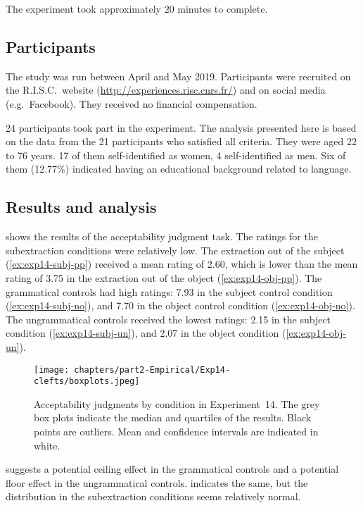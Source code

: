 The experiment took approximately 20 minutes to complete. 

\subsection{Participants}

The study was run between April and May 2019. 
Participants were recruited on the R.I.S.C.\ website (\url{http://experiences.risc.cnrs.fr/}) and on social media (e.g.\ Facebook).
They received no financial compensation.

24 participants took part in the experiment. 
The analysis presented here is based on the data from the 21 participants who satisfied all criteria.
They were aged 22 to 76 years. 17 of them self-identified as women, 4 self-identified as men. Six of them (12.77\%) indicated having an educational background related to language.

\subsection{Results and analysis}

 shows the results of the acceptability judgment task. The ratings for the subextraction conditions were relatively low. The extraction out of the subject (\ref{ex:exp14-subj-pp}) received a mean  rating of 2.60, which is lower than the mean rating of 3.75 in the extraction out of the object (\ref{ex:exp14-obj-pp}). The grammatical controls had high  ratings: 7.93 in the subject control condition (\ref{ex:exp14-subj-no}), and 7.70 in the object control condition (\ref{ex:exp14-obj-no}). The ungrammatical controls received the lowest ratings: 2.15 in the subject condition (\ref{ex:exp14-subj-un}), and 2.07 in the object condition (\ref{ex:exp14-obj-un}). 

\begin{figure}
    \centering
    \texttt{[image: chapters/part2-Empirical/Exp14-clefts/boxplots.jpeg]}
    \caption{Acceptability judgments by condition in Experiment~14. The grey box plots indicate the median and quartiles of the results. Black points are outliers. Mean and confidence intervals are indicated in white.}
    \label{fig:exp14-boxplot}
\end{figure}

 suggests a potential ceiling effect in the grammatical controls and a potential floor effect in the ungrammatical controls.  indicates the same, but the distribution in the subextraction conditions seems relatively normal.

